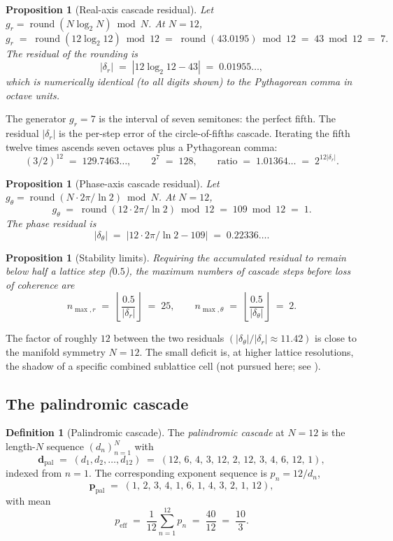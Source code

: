 \documentclass[11pt,a4paper]{article}
\newtheorem{proposition}[theorem]{Proposition}
\theoremstyle{definition}
\newtheorem{definition}[theorem]{Definition}
\theoremstyle{remark}
\DeclareMathOperator{\round}{round}
\begin{document}
\begin{proposition}[Real-axis cascade residual]\label{prop:cascader}
Let $g_{r} = \round(N\log_{2}N)\bmod N$. At $N=12$,
\[
g_{r} \;=\; \round(12\log_{2}12)\bmod 12 \;=\; \round(43.0195)\bmod 12 \;=\; 43\bmod 12 \;=\; 7.
\]
The residual of the rounding is
\[
|\delta_{r}| \;=\; |12\log_{2}12 - 43| \;=\; 0.01955\ldots,
\]
which is numerically identical (to all digits shown) to the Pythagorean comma in octave units.
\end{proposition}

The generator $g_{r}=7$ is the interval of seven semitones: the perfect fifth. The residual $|\delta_{r}|$ is the per-step error of the circle-of-fifths cascade. Iterating the fifth twelve times ascends seven octaves plus a Pythagorean comma:
\[
(3/2)^{12} \;=\; 129.7463\ldots, \qquad 2^{7} \;=\; 128, \qquad \text{ratio} \;=\; 1.01364\ldots \;=\; 2^{12|\delta_{r}|}.
\]

\begin{proposition}[Phase-axis cascade residual]\label{prop:cascadetheta}
Let $g_{\theta} = \round(N\cdot 2\pi/\ln 2)\bmod N$. At $N=12$,
\[
g_{\theta} \;=\; \round(12\cdot 2\pi/\ln 2)\bmod 12 \;=\; 109\bmod 12 \;=\; 1.
\]
The phase residual is
\[
|\delta_{\theta}| \;=\; \bigl|12\cdot 2\pi/\ln 2 - 109\bigr| \;=\; 0.22336\ldots.
\]
\end{proposition}

\begin{proposition}[Stability limits]\label{prop:stability}
Requiring the accumulated residual to remain below half a lattice step ($0.5$), the maximum numbers of cascade steps before loss of coherence are
\[
n_{\max,r} \;=\; \left\lfloor\frac{0.5}{|\delta_{r}|}\right\rfloor \;=\; 25, \qquad
n_{\max,\theta} \;=\; \left\lfloor\frac{0.5}{|\delta_{\theta}|}\right\rfloor \;=\; 2.
\]
\end{proposition}

The factor of roughly $12$ between the two residuals $(|\delta_{\theta}|/|\delta_{r}| \approx 11.42)$ is close to the manifold symmetry $N=12$. The small deficit is, at higher lattice resolutions, the shadow of a specific combined sublattice cell (not pursued here; see \cite{Guide}).

\subsection{The palindromic cascade}

\begin{definition}[Palindromic cascade]\label{def:palindrome}
The \emph{palindromic cascade} at $N=12$ is the length-$N$ sequence $(d_{n})_{n=1}^{N}$ with
\[
\mathbf{d}_{\mathrm{pal}} \;=\; (d_{1},d_{2},\ldots,d_{12}) \;=\; (12,\,6,\,4,\,3,\,12,\,2,\,12,\,3,\,4,\,6,\,12,\,1),
\]
indexed from $n=1$. The corresponding exponent sequence is $p_{n}=12/d_{n}$,
\[
\mathbf{p}_{\mathrm{pal}} \;=\; (1,\,2,\,3,\,4,\,1,\,6,\,1,\,4,\,3,\,2,\,1,\,12),
\]
with mean
\[
p_{\mathrm{eff}} \;=\; \frac{1}{12}\sum_{n=1}^{12}p_{n} \;=\; \frac{40}{12} \;=\; \frac{10}{3}.
\]
\end{definition}
\end{document}
